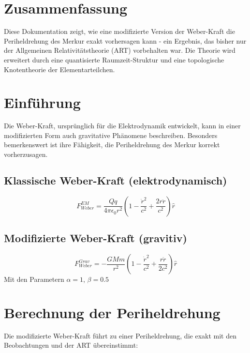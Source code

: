 \documentclass{article}
\begin{document}
\begin{center}
\end{center}

\section{Zusammenfassung}
Diese Dokumentation zeigt, wie eine modifizierte Version der Weber-Kraft die Periheldrehung des Merkur exakt vorhersagen kann - ein Ergebnis, das bisher nur der Allgemeinen Relativitätstheorie (ART) vorbehalten war. Die Theorie wird erweitert durch eine quantisierte Raumzeit-Struktur und eine topologische Knotentheorie der Elementarteilchen.

\section{Einführung}
Die Weber-Kraft, ursprünglich für die Elektrodynamik entwickelt, kann in einer modifizierten Form auch gravitative Phänomene beschreiben. Besonders bemerkenswert ist ihre Fähigkeit, die Periheldrehung des Merkur korrekt vorherzusagen.

\subsection*{Klassische Weber-Kraft (elektrodynamisch)}
\[ F_{Weber}^{EM} = \frac{Qq}{4\pi\epsilon_0 r^2}\left(1 - \frac{\dot{r}^2}{c^2} + \frac{2r\ddot{r}}{c^2}\right)\hat{r} \]

\subsection*{Modifizierte Weber-Kraft (gravitiv)}
\[ F_{Weber}^{Grav} = -\frac{GMm}{r^2}\left(1 - \frac{\dot{r}^2}{c^2} + \frac{r\ddot{r}}{2c^2}\right)\hat{r} \]
Mit den Parametern $\alpha=1$, $\beta=0.5$

\section{Berechnung der Periheldrehung}
Die modifizierte Weber-Kraft führt zu einer Periheldrehung, die exakt mit den Beobachtungen und der ART übereinstimmt:
\end{document}
